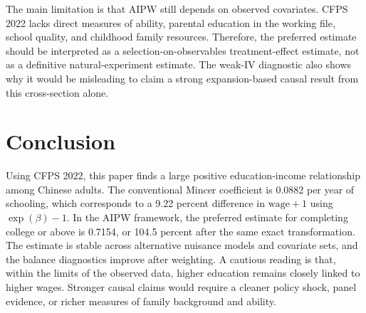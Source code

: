 \documentclass[12pt]{article}
\begin{document}
The main limitation is that AIPW still depends on observed covariates. CFPS 2022 lacks direct measures of ability, parental education in the working file, school quality, and childhood family resources. Therefore, the preferred estimate should be interpreted as a selection-on-observables treatment-effect estimate, not as a definitive natural-experiment estimate. The weak-IV diagnostic also shows why it would be misleading to claim a strong expansion-based causal result from this cross-section alone.

\section{Conclusion}

Using CFPS 2022, this paper finds a large positive education-income relationship among Chinese adults. The conventional Mincer coefficient is 0.0882 per year of schooling, which corresponds to a 9.22 percent difference in $\mathrm{wage}+1$ using $\exp(\beta)-1$. In the AIPW framework, the preferred estimate for completing college or above is 0.7154, or 104.5 percent after the same exact transformation. The estimate is stable across alternative nuisance models and covariate sets, and the balance diagnostics improve after weighting. A cautious reading is that, within the limits of the observed data, higher education remains closely linked to higher wages. Stronger causal claims would require a cleaner policy shock, panel evidence, or richer measures of family background and ability.



\end{document}

